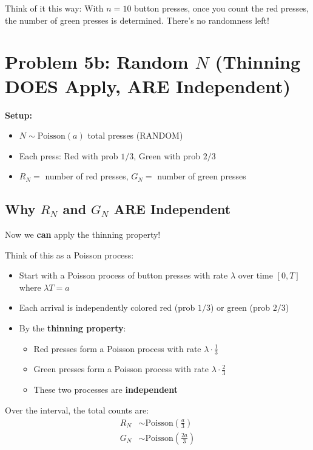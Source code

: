 \documentclass[12pt]{article}
\begin{document}
Think of it this way: With $n = 10$ button presses, once you count the red presses, the number of green presses is determined. There's no randomness left!

\newpage

\section*{Problem 5b: Random $N$ (Thinning DOES Apply, ARE Independent)}

\textbf{Setup:}
\begin{itemize}
    \item $N \sim \text{Poisson}(a)$ total presses (RANDOM)
    \item Each press: Red with prob $1/3$, Green with prob $2/3$
    \item $R_N =$ number of red presses, $G_N =$ number of green presses
\end{itemize}

\subsection*{Why $R_N$ and $G_N$ ARE Independent}

Now we \textbf{can} apply the thinning property!

Think of this as a Poisson process:
\begin{itemize}
    \item Start with a Poisson process of button presses with rate $\lambda$ over time $[0, T]$ where $\lambda T = a$
    \item Each arrival is independently colored red (prob $1/3$) or green (prob $2/3$)
    \item By the \textbf{thinning property}:
    \begin{itemize}
        \item Red presses form a Poisson process with rate $\lambda \cdot \frac{1}{3}$
        \item Green presses form a Poisson process with rate $\lambda \cdot \frac{2}{3}$
        \item These two processes are \textbf{independent}
    \end{itemize}
\end{itemize}

Over the interval, the total counts are:
\begin{align*}
R_N &\sim \text{Poisson}\left(\frac{a}{3}\right)\\
G_N &\sim \text{Poisson}\left(\frac{2a}{3}\right)
\end{align*}
\end{document}
